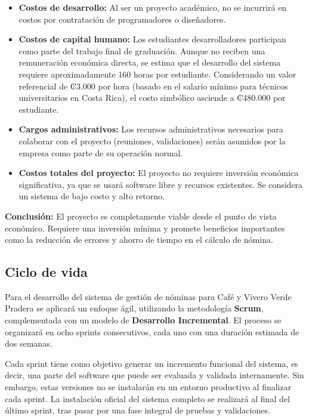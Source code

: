 \begin{itemize}
	\item \textbf{Costos de desarrollo:} Al ser un proyecto académico, no se incurrirá en costos por contratación de programadores o diseñadores.

	\item \textbf{Costos de capital humano:} Los estudiantes desarrolladores participan como parte del trabajo final de graduación. Aunque no reciben una remuneración económica directa, se estima que el desarrollo del sistema requiere aproximadamente 160 horas por estudiante. Considerando un valor referencial de ₡3.000 por hora (basado en el salario mínimo para técnicos universitarios en Costa Rica), el costo simbólico asciende a ₡480.000 por estudiante.

	\item \textbf{Cargos administrativos:} Los recursos administrativos necesarios para colaborar con el proyecto (reuniones, validaciones) serán asumidos por la empresa como parte de su operación normal.

	\item \textbf{Costos totales del proyecto:} El proyecto no requiere inversión económica significativa, ya que se usará software libre y recursos existentes. Se considera un sistema de bajo costo y alto retorno.
\end{itemize}

\textbf{Conclusión:} El proyecto es completamente viable desde el punto de vista económico. Requiere una inversión mínima y promete beneficios importantes como la reducción de errores y ahorro de tiempo en el cálculo de nómina.

\subsection{Ciclo de vida}

Para el desarrollo del sistema de gestión de nóminas para Café y Vivero Verde Pradera se aplicará un enfoque ágil, utilizando la metodología \textbf{Scrum}, complementada con un modelo de \textbf{Desarrollo Incremental}. El proceso se organizará en ocho sprints consecutivos, cada uno con una duración estimada de dos semanas.

Cada sprint tiene como objetivo generar un incremento funcional del sistema, es decir, una parte del software que puede ser evaluada y validada internamente. Sin embargo, estas versiones no se instalarán en un entorno productivo al finalizar cada sprint. La instalación oficial del sistema completo se realizará al final del último sprint, tras pasar por una fase integral de pruebas y validaciones.

